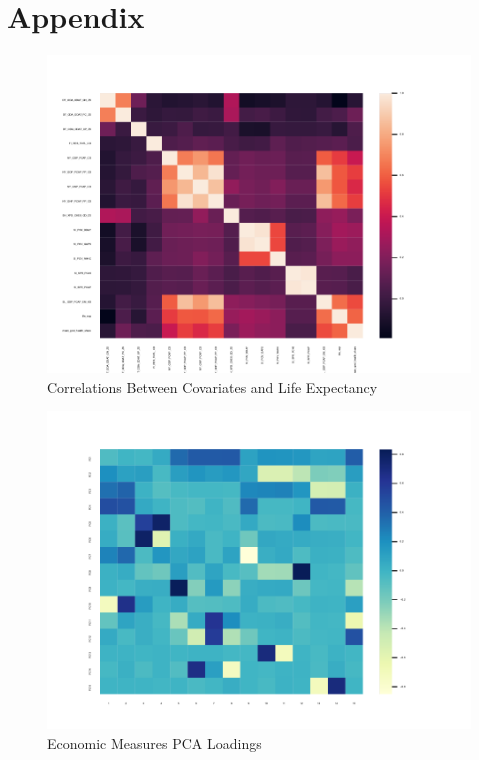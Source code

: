 \documentclass{report}
\begin{document}
	

    \clearpage \newpage

    \appendix

    \section*{Appendix}

	\begin{figure}[h!]
		\centering
		\caption{Correlations Between Covariates and Life Expectancy}
		\label{LE_Health_Econ_Correlations}	
		\includegraphics[width=\linewidth,keepaspectratio=true]{../Output/Figures/LE_Health_Econ_Correlations.pdf}
	\end{figure}

	\begin{figure}[h!]
		\centering
		\caption{Economic Measures PCA Loadings}
		\label{Econ_Loadings}	
		\includegraphics[width=\linewidth,keepaspectratio=true]{../Output/Figures/Econ_Indicator_Loadings.pdf}
	\end{figure}
\end{document}
